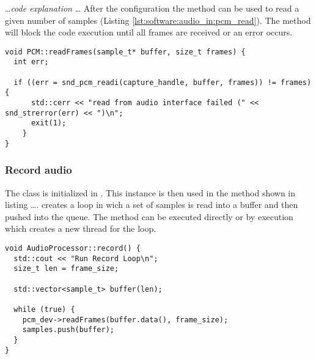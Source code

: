 %
\dots \textit{code explanation} \dots\p
%
After the configuration the method  can be used to read a given number of samples (Listing \ref{lst:software:audio_in:pcm_read}). The method will block the code execution until all frames are received or an error occurs.
%
\begin{mdframed}
\begin{lstlisting}[caption=Method for reading frames from an ALSA device, label=lst:software:audio_in:pcm_read]
void PCM::readFrames(sample_t* buffer, size_t frames) {
  int err;

  if ((err = snd_pcm_readi(capture_handle, buffer, frames)) != frames) {
      std::cerr << "read from audio interface failed (" << snd_strerror(err) << ")\n";
      exit(1);
    }
}
  \end{lstlisting}
\end{mdframed}
%
\subsubsection*{Record audio}
%
The  class is initialized in . This instance is then used in the method  shown in listing \dots.  creates a loop in wich a set of samples is read into a buffer and then pushed into the  queue. The method can be executed directly or by execution  which creates a new thread for the loop.

\begin{mdframed}
\begin{lstlisting}[caption=Record loop, label=lst:software:audio_in:record]
void AudioProcessor::record() {
  std::cout << "Run Record Loop\n";
  size_t len = frame_size;

  std::vector<sample_t> buffer(len);

  while (true) {
    pcm_dev->readFrames(buffer.data(), frame_size);
    samples.push(buffer);
  }
}
\end{lstlisting}
\end{mdframed}